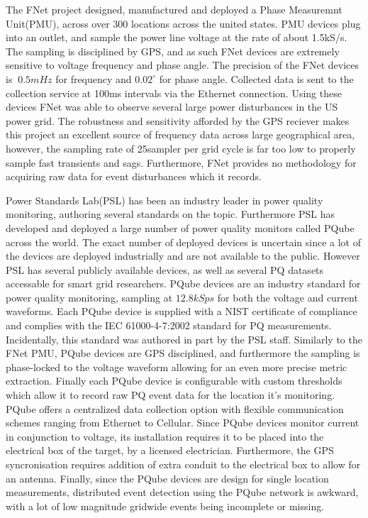 The FNet project designed, manufactured and deployed a Phase Measuremnt Unit(PMU), across over 300 locations across the united states.\cite{zhang2010wide} PMU devices plug into an outlet, and sample the power line voltage at the rate of about 1.5kS/s. The sampling is disciplined by GPS, and as such FNet devices are extremely sensitive to voltage frequency and phase angle. The precision of the FNet devices is $~0.5mHz$ for frequency and $0.02^{\circ}$ for phase angle. Collected data is sent to the collection service at 100ms intervals via the Ethernet connection. Using these devices FNet was able to observe several large power disturbances in the US power grid. The robustness and sensitivity afforded by the GPS reciever makes this project an excellent source of frequency data across large geographical area, however,  the sampling rate of 25sampler per grid cycle is far too low to properly sample fast transients and sags. Furthermore, FNet provides no methodology for acquiring raw data for event disturbances which it records.

Power Standards Lab(PSL) has been an industry leader in power quality monitoring, authoring several standards on the topic. Furthermore PSL has developed and deployed a large number of power quality monitors called PQube across the world. The exact number of deployed devices is uncertain since a lot of the devices are deployed industrially and are not available to the public. However PSL has several publicly available devices, as well as several PQ datasets accessable for smart grid researchers. PQube devices are an industry standard for power quality monitoring, sampling at $12.8kSps$ for both the voltage and current waveforms.\cite{pqube_spec} Each PQube device is supplied with a NIST certificate of compliance and complies with the IEC 61000-4-7:2002 standard for PQ measurements. Incidentally, this standard was authored in part by the PSL staff. Similarly to the FNet PMU, PQube devices are GPS disciplined, and furthermore the sampling is phase-locked to the voltage waveform allowing for an even more precise metric extraction. Finally each PQube device is configurable with custom thresholds which allow it to record raw PQ event data for the location it's monitoring. PQube offers a centralized data collection option with flexible communication schemes ranging from Ethernet to Cellular. Since PQube devices monitor current in conjunction to voltage, its installation requires it to be placed into the electrical box of the target, by a licensed electrician.\cite{von2014micro} Furthermore, the GPS syncronisation requires addition of extra conduit to the electrical box to allow for an antenna. Finally, since the PQube devices are design for single location measurements, distributed event detection using the PQube network is awkward, with a lot of low magnitude gridwide events being incomplete or missing. 

